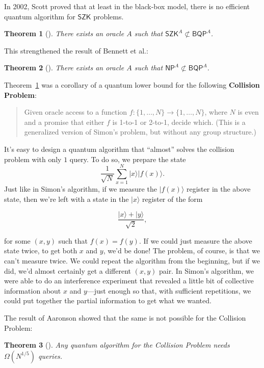 \documentclass[11pt]{report}
\theoremstyle{plain}
\newtheorem{theorem}{Theorem}[section]
\theoremstyle{definition}
\renewcommand{\ket}[1]{|#1\rangle}
\begin{document}
In 2002, Scott proved that at least in the black-box model, there is no efficient quantum algorithm for $\mathsf{SZK}$ problems.

\begin{theorem}[\cite{aar:col}]\label{A03}
There exists an oracle $A$ such that $\mathsf{SZK}^A \not\subset \mathsf{BQP}^A$.
\end{theorem}

This strengthened the result of Bennett et al.:
\begin{theorem}[\cite{DBLP:journals/siamcomp/BennettBBV97}]
There exists an oracle $A$ such that $\mathsf{NP}^A \not\subset \mathsf{BQP}^A$.
\end{theorem}

Theorem~\ref{A03} was a corollary of a quantum lower bound for the following \textbf{Collision Problem}:
\begin{quote}
Given oracle access to a function  $f\colon \{1,\dots, N\} \to \{1,\dots, N\}$,  where $N$ is even and a promise that either $f$ is 1-to-1 or 2-to-1, decide which. (This is a generalized version of Simon's problem, but without any group structure.)
\end{quote}

It's easy to design a quantum algorithm that ``almost'' solves the collision problem with only $1$ query.  To do so, we prepare the state
\[
\frac{1}{\sqrt{N}} \sum_{x=1}^N \ket{x} \ket{f(x)}.
\]
Just like in Simon's algorithm, if we measure the $\ket{f(x)}$ register in the above state, then we're left with a state in the $\ket{x}$ register of the form

$$\frac{\ket{x} + \ket{y}}{\sqrt{2}},$$

\noindent for some $(x,y)$ such that $f(x)=f(y)$.  If we could just measure the above state twice, to get both $x$ and $y$, we'd be done!  The problem, of course, is that we can't measure twice.  We could repeat the algorithm from the beginning, but if we did, we'd almost certainly get a different $(x,y)$ pair.  In Simon's algorithm, we were able to do an interference experiment that revealed a little bit of collective information about $x$ and $y$---just enough so that, with sufficient repetitions, we could put together the partial information to get what we wanted.

The result of Aaronson \cite{aar:col} showed that the same is not possible for the Collision Problem:

\begin{theorem}[\cite{aar:col}]
\label{colthm}
Any quantum algorithm for the Collision Problem needs $\Omega(N^{1/5})$ queries.
\end{theorem}
\end{document}

